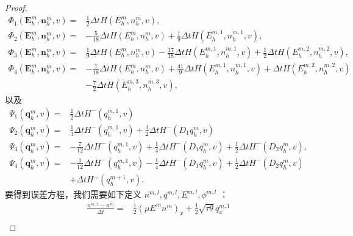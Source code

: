 \begin{proof}
    \begin{align*}
        \Phi_1 (\boldsymbol{E}_h^m, \boldsymbol{n}_h^m, v) = & \frac{1}{2} \Delta t H (E_h^m, n_h^m, v),                                                                                                         \\
        \Phi_2 (\boldsymbol{E}_h^m, \boldsymbol{n}_h^m, v) = & -\frac{5}{18} \Delta t H (E_h^m, n_h^m, v) + \frac{1}{9} \Delta t H (E_h^{m,1}, n_h^{m,1}, v),                                                    \\
        \Phi_3 (\boldsymbol{E}_h^m, \boldsymbol{n}_h^m, v) = & \frac{1}{9} \Delta t H (E_h^m, n_h^m, v) - \frac{17}{18} \Delta t H (E_h^{m,1}, n_h^{m,1}, v) + \frac{1}{2} \Delta t H (E_h^{m,2}, n_h^{m,2}, v), \\
        \Phi_4 (\boldsymbol{E}_h^m, \boldsymbol{n}_h^m, v) = & -\frac{7}{18} \Delta t H (E_h^m, n_h^m, v) + \frac{41}{9} \Delta t H (E_h^{m,1}, n_h^{m,1}, v) + \Delta t H (E_h^{m,2}, n_h^{m,2}, v)             \\
                                                             & -\frac{7}{2} \Delta t H (E_h^{m,3}, n_h^{m,3}, v),
    \end{align*}
    以及
    \begin{align*}
        \Psi_1 (\boldsymbol{q}_h^m, v) = & \frac{1}{2} \Delta t H^- (q_h^{m,1}, v)                                                                                        \\
        \Psi_2 (\boldsymbol{q}_h^m, v) = & \frac{1}{3} \Delta t H^- (q_h^{m,1}, v) + \frac{1}{2} \Delta t H^- (D_1 q_h^m, v)                                              \\
        \Psi_3 (\boldsymbol{q}_h^m, v) = & -\frac{7}{12} \Delta t H^- (q_h^{m,1}, v) + \frac{1}{4} \Delta t H^- (D_1 q_h^m, v) + \frac{1}{2} \Delta t H^- (D_2 q_h^m, v), \\
        \Psi_4 (\boldsymbol{q}_h^m, v) = & -\frac{1}{12} \Delta t H^- (q_h^{m,1}, v) - \frac{1}{4} \Delta t H^- (D_1 q_h^m, v) + \frac{1}{2} \Delta t H^- (D_2 q_h^m, v)  \\
                                         & +\Delta t H^- (q_h^{m+1}, v) .
    \end{align*}
    要得到误差方程，我们需要如下定义 $n^{m,l}, q^{m,l}, E^{m,l}, \phi^{m,l}$ ：
    \begin{equation}
        \begin{split}
            \frac{n^{m,1} - n^m}{\Delta t} = & \frac{1}{2} (\mu E^m n^m)_x + \frac{1}{2} \sqrt{\tau \theta} q_x^{m,1} \\

\end{split}
\end{equation}
\end{proof}
